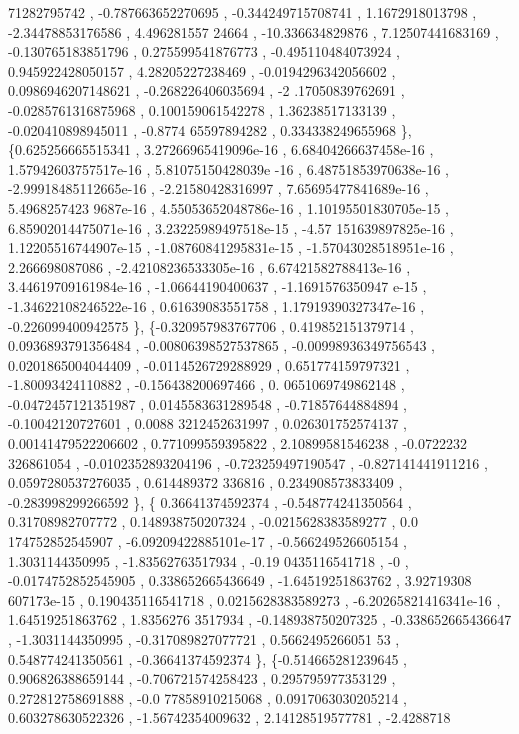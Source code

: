 \begin{DoxyCode}
      71282795742 , -0.787663652270695 , -0.344249715708741 ,   1.1672918013798 , -2.34478853176586 ,  4.496281557
      24664 ,  -10.336634829876 ,  7.12507441683169 , -0.130765183851796 , 0.275599541876773 , -0.495110484073924 
      , 0.945922428050157 ,  4.28205227238469 , -0.0194296342056602 , 0.0986946207148621 , -0.268226406035694 , -2
      .17050839762691 , -0.0285761316875968 , 0.100159061542278 ,  1.36238517133139 , -0.020410898945011 , -0.8774
      65597894282 , 0.334338249655968 \},
\{0.625256665515341 , 3.27266965419096e-16 , 6.68404266637458e-16 , 1.57942603757517e-16 , 5.81075150428039e
      -16 , 6.48751853970638e-16 , -2.99918485112665e-16 , -2.21580428316997 , 7.65695477841689e-16 , 5.4968257423
      9687e-16 , 4.55053652048786e-16 , 1.10195501830705e-15 , 6.85902014475071e-16 , 3.23225989497518e-15 , -4.57
      151639897825e-16 , 1.12205516744907e-15 , -1.08760841295831e-15 , -1.57043028518951e-16 ,    2.266698087086 
      , -2.42108236533305e-16 , 6.67421582788413e-16 , 3.44619709161984e-16 , -1.06644190400637 , -1.1691576350947
      e-15 , -1.34622108246522e-16 ,  0.61639083551758 , 1.17919390327347e-16 , -0.226099400942575 \},
\{-0.320957983767706 , 0.419852151379714 , 0.0936893791356484 , -0.00806398527537865 , -0.00998936349756543 
      , 0.0201865004044409 , -0.0114526729288929 , 0.651774159797321 , -1.80093424110882 , -0.156438200697466 , 0.
      0651069749862148 , -0.0472457121351987 , 0.0145583631289548 , -0.71857644884894 , -0.10042120727601 , 0.0088
      3212452631997 , 0.026301752574137 , 0.00141479522206602 , 0.771099559395822 ,  2.10899581546238 , -0.0722232
      326861054 , -0.0102352893204196 , -0.723259497190547 , -0.827141441911216 , 0.0597280537276035 , 0.614489372
      336816 , 0.234908573833409 , -0.283998299266592 \},
\{ 0.36641374592374 , -0.548774241350564 ,  0.31708982707772 , 0.148938750207324 , -0.0215628383589277 , 0.0
      174752852545907 , -6.09209422885101e-17 , -0.566249526605154 ,   1.3031144350995 , -1.83562763517934 , -0.19
      0435116541718 ,                -0 , -0.0174752852545905 , 0.338652665436649 , -1.64519251863762 , 3.92719308
      607173e-15 , 0.190435116541718 , 0.0215628383589273 , -6.20265821416341e-16 ,  1.64519251863762 ,  1.8356276
      3517934 , -0.148938750207325 , -0.338652665436647 ,  -1.3031144350995 , -0.317089827077721 , 0.5662495266051
      53 , 0.548774241350561 , -0.36641374592374 \},
\{-0.514665281239645 , 0.906826388659144 , -0.706721574258423 , 0.295795977353129 , 0.272812758691888 , -0.0
      77858910215068 , 0.0917063030205214 , 0.603278630522326 , -1.56742354009632 ,  2.14128519577781 , -2.4288718

\end{DoxyCode}
